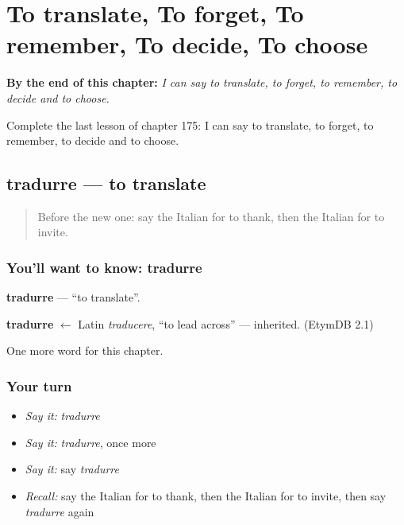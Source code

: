 
\chapter{To translate, To forget, To remember, To decide, To choose}
\label{ch:it-to-translate-to-forget-to-remember-to-decide-to-choose}

\begin{chapteropening}
\textbf{By the end of this chapter:} \emph{I can say to translate, to forget, to remember, to decide and to choose.}

Complete the last lesson of chapter 175: I can say to translate, to forget, to remember, to decide and to choose.
\end{chapteropening}

\section[tradurre]{tradurre — to translate}

\label{lesson:IT-C175-tradurre}



\begin{quote}
Before the new one: say the Italian for to thank, then the Italian for to invite.
\end{quote}

\subsection*{You'll want to know: tradurre}
\textbf{tradurre} — \textquotedblleft{}to translate\textquotedblright{}.

\begin{cousinweb}
\textbf{tradurre} $\leftarrow$ Latin \emph{traducere}, \textquotedblleft{}to lead across\textquotedblright{} — inherited. (EtymDB 2.1)
\end{cousinweb}

\begin{grammarlens}[title={What you've built}]
One more word for this chapter.
\end{grammarlens}

\subsection*{Your turn}
\begin{itemize}
\raggedright
  \item \emph{Say it:} \emph{tradurre}
  \item \emph{Say it:} \emph{tradurre}, once more
  \item \emph{Say it:} say \emph{tradurre}
  \item \emph{Recall:} say the Italian for to thank, then the Italian for to invite, then say \emph{tradurre} again
\end{itemize}

